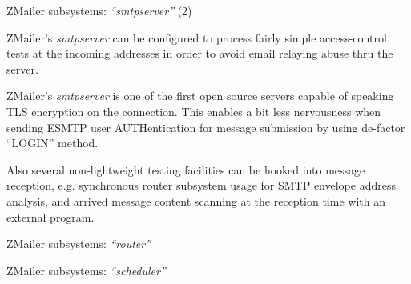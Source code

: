 \documentclass[a4paper,landscape]{slides}
\newcommand{\ZM}{ZMailer}
\begin{document}


\begin{slide}

\centerline{\large \ZM{} subsystems: {\it ``smtpserver''} (2)}

\ZM's {\it smtpserver} can be configured to process fairly simple
access-control tests at the incoming addresses in order to avoid
email relaying abuse thru the server.

\ZM's {\it smtpserver} is one of the first open source servers
capable of speaking TLS encryption on the connection.
This enables a bit less nervousness when sending ESMTP user AUTHentication
for message submission by using de-factor ``LOGIN'' method.

Also several non-lightweight testing facilities can be hooked into
message reception, e.g. synchronous router subsystem usage for
SMTP envelope address analysis, and arrived message content scanning
at the reception time with an external program.


\end{slide}



\begin{slide}

\centerline{\large \ZM{} subsystems: {\it ``router''}}

\vfill

\end{slide}



\begin{slide}

\centerline{\large \ZM{} subsystems: {\it ``scheduler''}}

\vfill

\end{slide}

\end{document}
